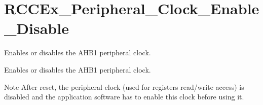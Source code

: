 \hypertarget{group___r_c_c_ex___peripheral___clock___enable___disable}{\section{R\-C\-C\-Ex\-\_\-\-Peripheral\-\_\-\-Clock\-\_\-\-Enable\-\_\-\-Disable}
\label{group___r_c_c_ex___peripheral___clock___enable___disable}
}


Enables or disables the A\-H\-B1 peripheral clock.  


Enables or disables the A\-H\-B1 peripheral clock. \begin{DoxyNote}{Note}
After reset, the peripheral clock (used for registers read/write access) is disabled and the application software has to enable this clock before using it. 
\end{DoxyNote}
